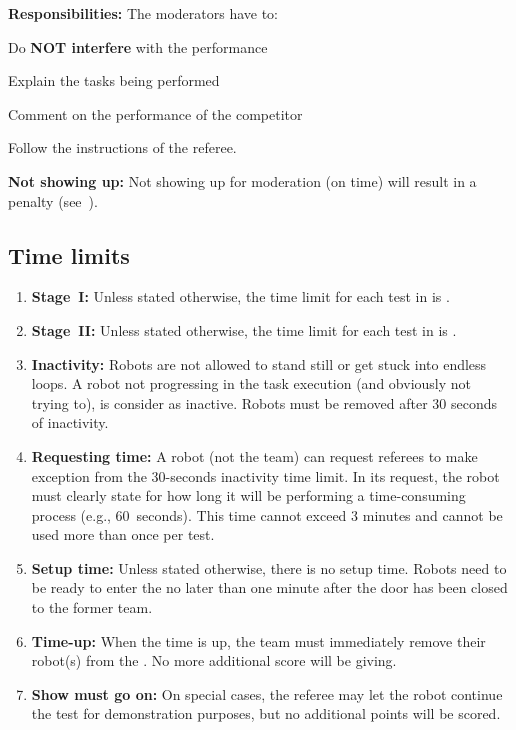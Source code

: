 \noindent\textbf{Responsibilities:} The moderators have to:
\begin{compactitem}
	\item Do \textbf{NOT interfere} with the performance
	\item Explain the tasks being performed
	\item Comment on the performance of the competitor
	\item Follow the instructions of the referee.
\end{compactitem}

\noindent \textbf{Not showing up:} Not showing up for moderation (on time) will result in a penalty (see~).


\subsection{Time limits}
\label{rule:time_limits}
\begin{enumerate}
	\item \textbf{Stage~I:} Unless stated otherwise, the time limit for each test in  is .

	\item \textbf{Stage~II:} Unless stated otherwise, the time limit for each test in  is .

	\item \textbf{Inactivity:} Robots are not allowed to stand still or get stuck into endless loops.
	A robot not progressing in the task execution (and obviously not trying to), is consider as inactive.
	Robots must be removed after 30 seconds of inactivity.

	\item \textbf{Requesting time:} A robot (not the team) can request referees to make exception from the 30-seconds inactivity time limit.
	In its request, the robot must clearly state for how long it will be performing a time-consuming process (e.g., 60~seconds).
	This time cannot exceed 3 minutes and cannot be used more than once per test.

	\item \textbf{Setup time:} Unless stated otherwise, there is no setup time.
	Robots need to be ready to enter the \Arena{} no later than one minute after the door has been closed to the former team.

	\item \textbf{Time-up:} When the time is up, the team must immediately remove their robot(s) from the  \Arena{}.
	No more additional score will be giving.

	\item \textbf{Show must go on:} On special cases, the referee may let the robot continue the test for demonstration purposes, but no additional points will be scored.
\end{enumerate}




